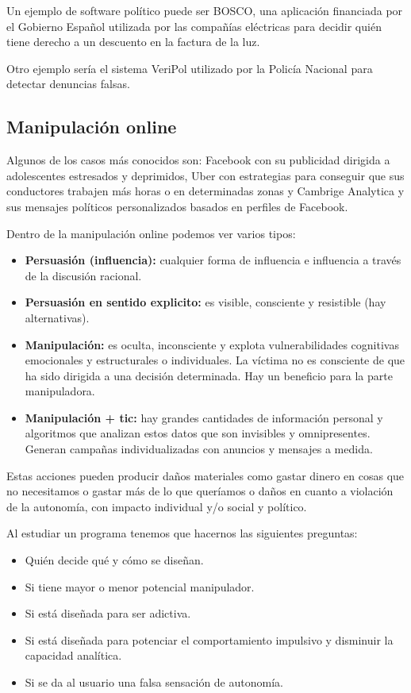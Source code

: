 Un ejemplo de software político puede ser BOSCO, una aplicación financiada por el Gobierno Español utilizada por las compañías eléctricas para decidir quién tiene derecho a un descuento en la factura de la luz.

Otro ejemplo sería el sistema VeriPol utilizado por la Policía Nacional para detectar denuncias falsas.

\subsection{Manipulación online}
Algunos de los casos más conocidos son: Facebook con su publicidad dirigida a adolescentes estresados y deprimidos, Uber con estrategias para conseguir que sus conductores trabajen más horas o en determinadas zonas y Cambrige Analytica y sus mensajes políticos personalizados basados en perfiles de Facebook.

Dentro de la manipulación online podemos ver varios tipos:
\begin{itemize}
    \item\textbf{Persuasión (influencia):} cualquier forma de influencia e influencia a través de la discusión racional.
    \item\textbf{Persuasión en sentido explicito:} es visible, consciente y resistible (hay alternativas).
    \item\textbf{Manipulación:} es oculta, inconsciente y explota vulnerabilidades cognitivas emocionales y estructurales o individuales. La víctima no es consciente de que ha sido dirigida a una decisión determinada. Hay un beneficio para la parte manipuladora.
    \item\textbf{Manipulación + \gls{tic}:} hay grandes cantidades de información personal y algoritmos que analizan estos datos que son invisibles y omnipresentes. Generan campañas individualizadas con anuncios y mensajes a medida.
\end{itemize}

Estas acciones pueden producir daños materiales como gastar dinero en cosas que no necesitamos o gastar más de lo que queríamos o daños en cuanto a violación de la autonomía, con impacto individual y/o social y político.

Al estudiar un programa tenemos que hacernos las siguientes preguntas:
\begin{itemize}
    \item Quién decide qué y cómo se diseñan.
    \item Si tiene  mayor o menor potencial manipulador.
    \item Si está diseñada para ser adictiva.
    \item Si está diseñada para potenciar el comportamiento impulsivo y disminuir la capacidad analítica.
    \item Si se da al usuario una falsa sensación de autonomía.
\end{itemize}

